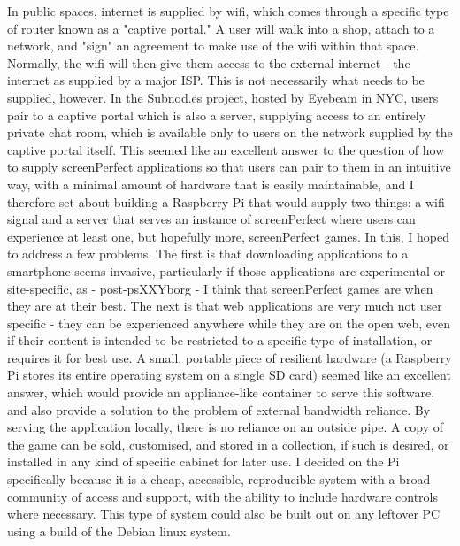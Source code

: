 In public spaces, internet is supplied by wifi, which comes through a specific type of router known as a "captive portal." A user will walk into a shop, attach to a network, and "sign" an agreement to make use of the wifi within that space. 
Normally, the wifi will then give them access to the external internet - the internet as supplied by a major ISP. This is not necessarily what needs to be supplied, however. In the Subnod.es project, hosted by Eyebeam in NYC, users pair to a captive portal which is also a server, supplying access to an entirely private chat room, which is available only to users on the network supplied by the captive portal itself. 
This seemed like an excellent answer to the question of how to supply screenPerfect applications so that users can pair to them in an intuitive way, with a minimal amount of hardware that is easily maintainable, and I therefore set about building a Raspberry Pi that would supply two things: a wifi signal and a server that serves an instance of screenPerfect where users can experience at least one, but hopefully more, screenPerfect games. 
In this, I hoped to address a few problems. The first is that downloading applications to a smartphone seems invasive, particularly if those applications are experimental or site-specific, as - post-psXXYborg - I think that screenPerfect games are when they are at their best. The next is that web applications are very much not user specific - they can be experienced anywhere while they are on the open web, even if their content is intended to be restricted to a specific type of installation, or requires it for best use. 
A small, portable piece of resilient hardware (a Raspberry Pi stores its entire operating system on a single SD card) seemed like an excellent answer, which would provide an appliance-like container to serve this software, and also provide a solution to the problem of external bandwidth reliance. By serving the application locally, there is no reliance on an outside pipe. A copy of the game can be sold, customised, and stored in a collection, if such is desired, or installed in any kind of specific cabinet for later use. 
I decided on the Pi specifically because it is a cheap, accessible, reproducible system with a broad community of access and support, with the ability to include hardware controls where necessary. This type of system could also be built out on any leftover PC using a build of the Debian linux system.

